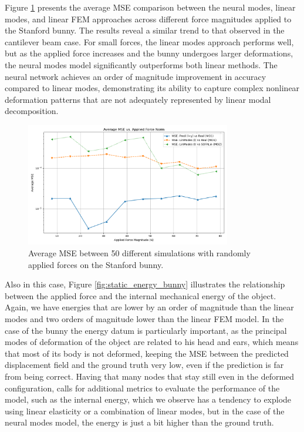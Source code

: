 Figure \ref{fig:static_mse_bunny} presents the average MSE comparison between the neural modes, linear modes, and linear FEM approaches across different force magnitudes applied to the Stanford bunny. The results reveal a similar trend to that observed in the cantilever beam case. For small forces, the linear modes approach performs well, but as the applied force increases and the bunny undergoes larger deformations, the neural modes model significantly outperforms both linear methods. The neural network achieves an order of magnitude improvement in accuracy compared to linear modes, demonstrating its ability to capture complex nonlinear deformation patterns that are not adequately represented by linear modal decomposition.
\begin{figure}[H]
    \centering
    \includegraphics[width=0.8\textwidth]{Images/bunny_static_mse.png}
    \caption{Average MSE between 50 different simulations with randomly applied forces on the Stanford bunny.}
    \label{fig:static_mse_bunny}
    \end{figure}

Also in this case, Figure \ref{fig:static_energy_bunny} illustrates the relationship between the applied force and the internal mechanical energy of the object. Again, we have energies that are lower by an order of magnitude than the linear modes and two orders of magnitude lower than the linear FEM model. In the case of the bunny the energy datum is particularly important, as the principal modes of deformation of the object are related to his head and ears, which means that most of its body is not deformed, keeping the MSE between the predicted displacement field and the ground truth very low, even if the prediction is far from being correct. Having that many nodes that stay still even in the deformed configuration, calls for additional metrics to evaluate the performance of the model, such as the internal energy, which we observe has a tendency to explode using linear elasticity or a combination of linear modes, but in the case of the neural modes model, the energy is just a bit higher than the ground truth.

